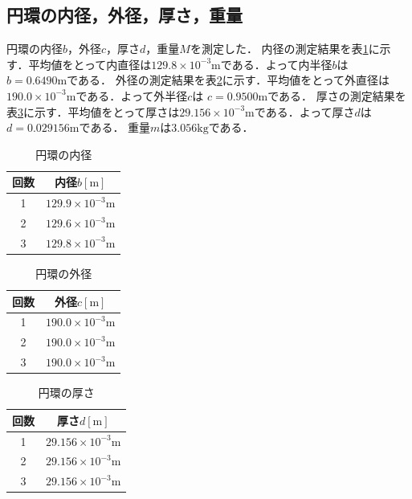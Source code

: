 \documentclass[a4paper,11pt]{ltjsarticle}
\begin{document}
\subsection{円環の内径，外径，厚さ，重量}
円環の内径$b$，外径$c$，厚さ$d$，重量$M$を測定した．
内径の測定結果を表\ref{tab:enkanb}に示す．平均値をとって内直径は$129.8 \times 10^{-3}\mathrm{m}$である．よって内半径$b$は
$b = 0.6490 \mathrm{m}$である．
外径の測定結果を表\ref{tab:enkand}に示す．平均値をとって外直径は$190.0 \times 10^{-3}\mathrm{m}$である．よって外半径$c$は
$c = 0.9500 \mathrm{m}$である．
厚さの測定結果を表\ref{tab:enkanc}に示す．平均値をとって厚さは$29.156 \times 10^{-3}\mathrm{m}$である．よって厚さ$d$は
$d = 0.029156 \mathrm{m}$である．
重量$m$は$3.056\mathrm{kg}$である．
\begin{table}[H]
  \centering
  \caption{円環の内径}
  \label{tab:enkanb}

  \begin{tabular}{c|c}
    \hline
    回数 & 内径$b[\mathrm{m}]$                \\
    \hline
    1  & $129.9 \times 10^{-3}\mathrm{m}$ \\
    \hline
    2  & $129.6 \times 10^{-3}\mathrm{m}$ \\
    \hline
    3  & $129.8 \times 10^{-3}\mathrm{m}$ \\
    \hline
  \end{tabular}
\end{table}
\begin{table}[H]
  \centering
  \caption{円環の外径}
  \label{tab:enkand}

  \begin{tabular}{c|c}
    \hline
    回数 & 外径$c[\mathrm{m}]$                \\
    \hline
    1  & $190.0 \times 10^{-3}\mathrm{m}$ \\
    \hline
    2  & $190.0 \times 10^{-3}\mathrm{m}$ \\
    \hline
    3  & $190.0 \times 10^{-3}\mathrm{m}$ \\
    \hline
  \end{tabular}
\end{table}
\begin{table}[H]
  \centering
  \caption{円環の厚さ}
  \label{tab:enkanc}

  \begin{tabular}{c|c}
    \hline
    回数 & 厚さ$d[\mathrm{m}]$                 \\
    \hline
    1  & $29.156 \times 10^{-3}\mathrm{m}$ \\
    \hline
    2  & $29.156 \times 10^{-3}\mathrm{m}$ \\
    \hline
    3  & $29.156 \times 10^{-3}\mathrm{m}$ \\
    \hline
  \end{tabular}
\end{table}
\end{document}
